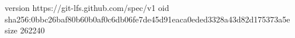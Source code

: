 version https://git-lfs.github.com/spec/v1
oid sha256:0bbc26baf80b60b0af0c6db06fe7de45d91eaca0eded3328a43d82d175373a5e
size 262240
